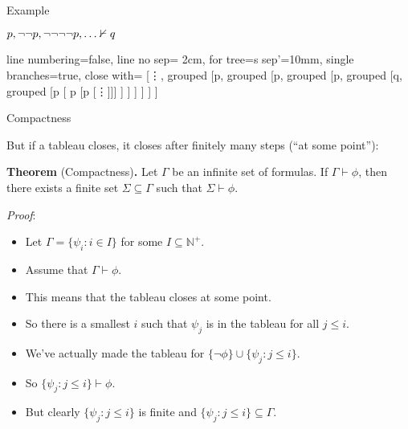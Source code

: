 \begin{frame}{Example}

$p, \neg\neg p, \neg\neg \neg\neg p, \mathellipsis\nvdash q$

\begin{center}
				\begin{prooftree}
					{
					line numbering=false,
					line no sep= 2cm,
					for tree={s sep'=10mm},
					single branches=true,
					close with=\xmark
					}
					[\vdots, grouped [\neg\neg\neg\neg p, grouped [\neg\neg p, grouped [p, grouped [\neg q, grouped [p [ \neg \neg p [p [\vdots ]]] ] ] ]  ] ] ]
					\end{prooftree}
				\end{center}


\end{frame}

\begin{frame}{Compactness}

But if a tableau closes, it closes after finitely many steps (``at some point''):

\textbf{Theorem} (Compactness)\textbf{.} Let $\Gamma$ be an infinite set of formulas. If $\Gamma\vdash\phi$, then there exists a finite set $\Sigma\subseteq\Gamma$ such that $\Sigma\vdash\phi$. 

\emph{Proof}:

	\begin{itemize}
	
		\item Let $\Gamma=\{\psi_i: i\in I\}$ for some $I\subseteq\mathbb{N}^+$.
	
		\item Assume that $\Gamma\vdash\phi$. 
		
		\item This means that the tableau closes at some point.
		
		\item So there is a smallest $i$ such that $\psi_j$ is in the tableau for all $j\leq i$.
		
		\item We've actually made the tableau for $\{\neg\phi\}\cup\{\psi_j: j\leq i\}$.
		
		\item So $\{\psi_j: j\leq i\}\vdash\phi$.
		
		\item But clearly $\{\psi_j: j\leq i\}$ is finite and $\{\psi_j: j\leq i\}\subseteq\Gamma$.
	
	\end{itemize}


\end{frame}

